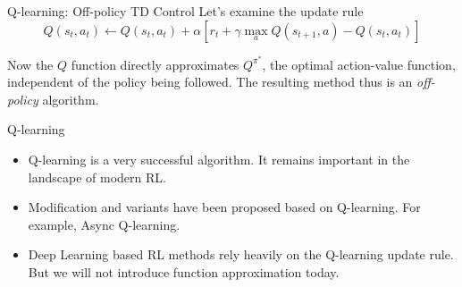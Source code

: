 \documentclass[handout]{beamer}
\begin{document}
\begin{frame}{Q-learning: Off-policy TD Control}
\footnotesize
Let's examine the update rule
$$ Q(s_t, a_t) \leftarrow Q(s_t, a_t) + \alpha \left[ r_t + \gamma \max_a Q(s_{t+1}, a) - Q(s_t, a_t)\right] $$

Now the $Q$ function directly approximates $Q^{\pi^*}$, the optimal action-value function, independent of the policy being followed. The resulting method thus is an \textit{off-policy} algorithm.

\begin{algorithm}[H]
	\caption{Q-learning for estimating $Q^{\pi}$}	
\end{algorithm}

\end{frame}

\begin{frame}{Q-learning}
\begin{itemize}
	\item Q-learning is a very successful algorithm. It remains important in the landscape of modern RL.
	\item Modification and variants have been proposed based on Q-learning. For example, Async Q-learning. 
	\item Deep Learning based RL methods rely heavily on the Q-learning update rule. But we will not introduce function approximation today.
\end{itemize}
\end{frame}
\end{document}
